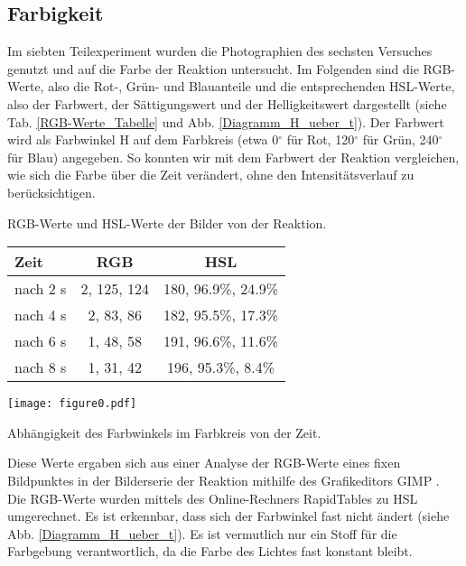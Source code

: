 \subsection{Farbigkeit}

Im siebten Teilexperiment wurden die Photographien des sechsten Versuches genutzt und auf die Farbe der Reaktion untersucht. Im Folgenden sind die RGB-Werte, also die Rot-, Grün- und Blauanteile und die entsprechenden HSL-Werte, also der Farbwert, der Sättigungswert und der Helligkeitswert dargestellt (siehe Tab. \ref{RGB-Werte_Tabelle} und Abb. \ref{Diagramm_H_ueber_t}). Der Farbwert wird als Farbwinkel H auf dem Farbkreis (etwa 0$^\circ$ für Rot, 120$^\circ$ für Grün, 240$^\circ$ für Blau) angegeben. So konnten wir mit dem Farbwert der Reaktion vergleichen, wie sich die Farbe über die Zeit verändert, ohne den Intensitätsverlauf zu berücksichtigen.

\begin{dsatable}
 \centering
 \caption{RGB-Werte und HSL-Werte der Bilder von der Reaktion.}
 \begin{tabular}{lcc} %
  \toprule
   Zeit  & RGB & HSL\\
  \midrule
   nach 2 s  & 2, 125, 124 &   180, 96.9\%, 24.9\%    \\
   nach 4 s  & 2, 83, 86   &   182, 95.5\%, 17.3\%    \\
   nach 6 s  & 1, 48, 58   &   191, 96.6\%, 11.6\%    \\
   nach 8 s  & 1, 31, 42   &   196, 95.3\%, 8.4\%     \\ 
  \bottomrule
 \end{tabular}
 \label{RGB-Werte_Tabelle}
 
\end{dsatable}

\begin{dsafigure}
	\centering
	\texttt{[image: figure0.pdf]}
	\label{Diagramm_H_ueber_t}
	\caption{Abhängigkeit des Farbwinkels im Farbkreis von der Zeit.}
\end{dsafigure}

Diese Werte ergaben sich aus einer Analyse der RGB-Werte eines fixen Bildpunktes in der Bilderserie der Reaktion mithilfe des Grafikeditors GIMP \cite{GIMP}. Die RGB-Werte wurden mittels des Online-Rechners RapidTables \cite{RapidTables} zu HSL umgerechnet. Es ist erkennbar, dass sich der Farbwinkel fast nicht ändert (siehe Abb. \ref{Diagramm_H_ueber_t}). Es ist vermutlich nur ein Stoff für die Farbgebung verantwortlich, da die Farbe des Lichtes fast konstant bleibt.
